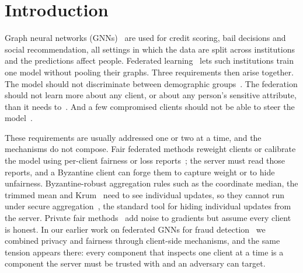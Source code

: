 \section{Introduction}\label{sec:intro}

Graph neural networks (GNNs)~\citep{kipf2016semi,velickovic2017graph} are used for credit scoring, bail decisions and social recommendation, all settings in which the data are split across institutions and the predictions affect people. Federated learning~\citep{mcmahan2017communication} lets such institutions train one model without pooling their graphs. Three requirements then arise together. The model should not discriminate between demographic groups~\citep{dai2021say,agarwal2021towards}. The federation should not learn more about any client, or about any person's sensitive attribute, than it needs to~\citep{abadi2016deep,mcmahan2018learning}. And a few compromised clients should not be able to steer the model~\citep{blanchard2017krum,yin2018byzantine,baruch2019little}.

These requirements are usually addressed one or two at a time, and the mechanisms do not compose. Fair federated methods reweight clients or calibrate the model using per-client fairness or loss reports~\citep{ezzeldin2023fairfed,li2020fair,fedfact2025}; the server must read those reports, and a Byzantine client can forge them to capture weight or to hide unfairness. Byzantine-robust aggregation rules such as the coordinate median, the trimmed mean and Krum~\citep{yin2018byzantine,blanchard2017krum} need to see individual updates, so they cannot run under secure aggregation~\citep{bonawitz2017practical}, the standard tool for hiding individual updates from the server. Private fair methods~\citep{corbucci2024puffle,ling2024feddp} add noise to gradients but assume every client is honest. In our earlier work on federated GNNs for fraud detection~\citep{dang2026fedfairgnn} we combined privacy and fairness through client-side mechanisms, and the same tension appears there: every component that inspects one client at a time is a component the server must be trusted with and an adversary can target.

